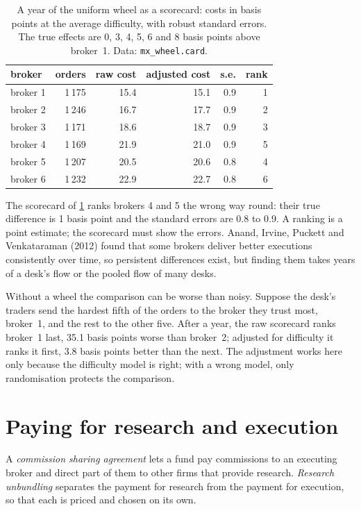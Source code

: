 \begin{table}[ht]
\centering
\small
\begin{tabular}{@{}lrrrrr@{}}
\toprule
broker & orders & raw cost & adjusted cost & s.e. & rank \\
\midrule
broker 1 & 1\,175 & 15.4 & 15.1 & 0.9 & 1 \\
broker 2 & 1\,246 & 16.7 & 17.7 & 0.9 & 2 \\
broker 3 & 1\,171 & 18.6 & 18.7 & 0.9 & 3 \\
broker 4 & 1\,169 & 21.9 & 21.0 & 0.9 & 5 \\
broker 5 & 1\,207 & 20.5 & 20.6 & 0.8 & 4 \\
broker 6 & 1\,232 & 22.9 & 22.7 & 0.8 & 6 \\
\bottomrule
\end{tabular}
\caption{A year of the uniform wheel as a scorecard: costs in basis points at the average difficulty, with robust standard errors. The true effects are
0, 3, 4, 5, 6 and 8 basis points above broker~1. Data: \texttt{mx\_wheel.card}.}\label{tab:mx:the-buy-side-trading-desk-and-its-brokers:card}
\end{table}

The scorecard of \cref{tab:mx:the-buy-side-trading-desk-and-its-brokers:card} ranks brokers 4 and 5 the wrong way round: their true difference is 1
basis point and the standard errors are 0.8 to 0.9. A ranking is a point estimate; the scorecard must show the errors. Anand, Irvine, Puckett and
Venkataraman (2012) found that some brokers deliver better executions consistently over time, so persistent differences exist, but finding them takes
years of a desk's flow or the pooled flow of many desks.

Without a wheel the comparison can be worse than noisy. Suppose the desk's traders send the hardest fifth of the orders to the broker they trust most,
broker~1, and the rest to the other five. After a year, the raw scorecard ranks broker~1 last, 35.1 basis points worse than broker~2; adjusted for
difficulty it ranks it first, 3.8 basis points better than the next. The adjustment works here only because the difficulty model is right; with a
wrong model, only randomisation protects the comparison.

\section{Paying for research and execution}

\begin{definition}\label{def:mx:the-buy-side-trading-desk-and-its-brokers:csa}
A \emph{commission sharing agreement} lets a fund pay commissions to an executing broker and direct part of them to
other firms that provide research. \emph{Research unbundling} separates the payment for research from the payment for
execution, so that each is priced and chosen on its own.
\end{definition}

